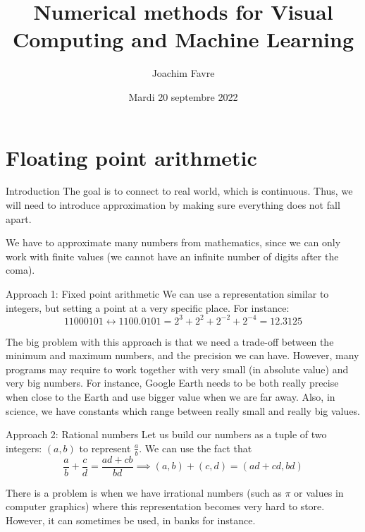 \documentclass[a4paper]{article}
\title{Numerical methods for Visual Computing and Machine Learning}
\author{Joachim Favre}
\date{Mardi 20 septembre 2022}
\begin{document}
\maketitle


\section{Floating point arithmetic}
\begin{parag}{Introduction}
    The goal is to connect to real world, which is continuous. Thus, we will need to introduce approximation by making sure everything does not fall apart.

    We have to approximate many numbers from mathematics, since we can only work with finite values (we cannot have an infinite number of digits after the coma).
\end{parag}

\begin{parag}{Approach 1: Fixed point arithmetic}
    We can use a representation similar to integers, but setting a point at a very specific place. For instance: 
    \[11000101 \leftrightarrow 1100.0101 = 2^3 + 2^2 + 2^{-2} + 2^{-4} = 12.3125\]
    
    The big problem with this approach is that we need a trade-off between the minimum and maximum numbers, and the precision we can have. However, many programs may require to work together with very small (in absolute value) and very big numbers. For instance, Google Earth needs to be both really precise when close to the Earth and use bigger value when we are far away. Also, in science, we have constants which range between really small and really big values.
\end{parag}

\begin{parag}{Approach 2: Rational numbers}
    Let us build our numbers as a tuple of two integers: $\left(a, b\right)$ to represent $\frac{a}{b}$. We can use the fact that 
    \[\frac{a}{b} + \frac{c}{d} = \frac{ad + cb}{bd} \implies \left(a, b\right) + \left(c, d\right) = \left(a d + c d, b d\right)\]
    
    There is a problem is when we have irrational numbers (such as $\pi$ or values in computer graphics) where this representation becomes very hard to store. However, it can sometimes be used, in banks for instance.
\end{parag}
\end{document}
